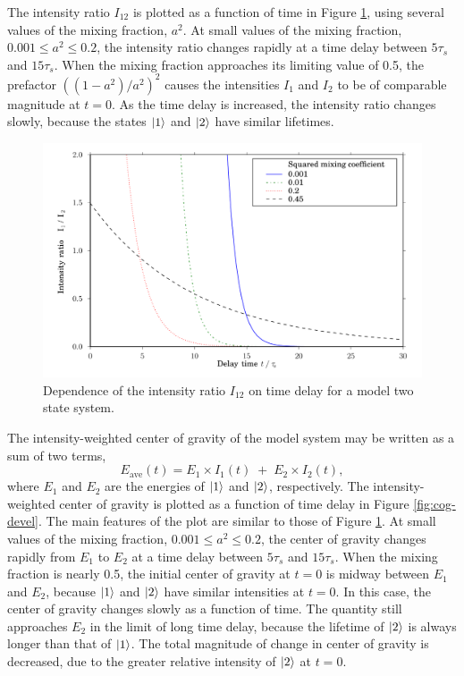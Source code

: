The intensity ratio $I_{12}$ is plotted as a function of time in
Figure \ref{fig:ratio-devel}, using several values of the mixing
fraction, $a^2$.  At small values of the mixing fraction, $0.001
\leq a^2 \leq 0.2$, the intensity ratio changes rapidly at a time
delay between $5\tau_s$ and $15\tau_s$.  When the mixing fraction
approaches its limiting value of 0.5, the prefactor $( (1 -
a^2)/a^2 )^2$ causes the intensities $I_1$ and $I_2$ to be
of comparable magnitude at $t=0$.  As the time delay is increased, the
intensity ratio changes slowly, because the states $\mathinner{|{1}\rangle}$ and
$\mathinner{|{2}\rangle}$ have similar lifetimes.

\begin{figure}
  \caption{Dependence of the intensity ratio $I_{12}$ on time delay
    for a model two state system.}
  \label{fig:ratio-devel}

  \centering
  \includegraphics[width=6in]{ratio-development.pdf}
\end{figure}

The intensity-weighted center of gravity of the model system may be
written as a sum of two terms,
\begin{equation}
  E_{\text{ave}}(t) = E_1 \times I_1(t) \; + \; E_2 \times I_2(t),
\end{equation}
where $E_1$ and $E_2$ are the energies of $\mathinner{|{1}\rangle}$ and $\mathinner{|{2}\rangle}$,
respectively.  The intensity-weighted center of gravity is plotted as
a function of time delay in Figure \ref{fig:cog-devel}.  The main
features of the plot are similar to those of Figure
\ref{fig:ratio-devel}.  At small values of the mixing fraction, $0.001
\leq a^2 \leq 0.2$, the center of gravity changes rapidly from $E_1$
to $E_2$ at a time delay between $5\tau_s$ and $15\tau_s$.  When the
mixing fraction is nearly 0.5, the initial center of gravity at $t=0$
is midway between $E_1$ and $E_2$, because $\mathinner{|{1}\rangle}$ and $\mathinner{|{2}\rangle}$
have similar intensities at $t=0$.  In this case, the center of
gravity changes slowly as a function of time.  The quantity still
approaches $E_2$ in the limit of long time delay, because the lifetime
of $\mathinner{|{2}\rangle}$ is always longer than that of $\mathinner{|{1}\rangle}$.  The total
magnitude of change in center of gravity is decreased, due to the
greater relative intensity of $\mathinner{|{2}\rangle}$ at $t=0$.

